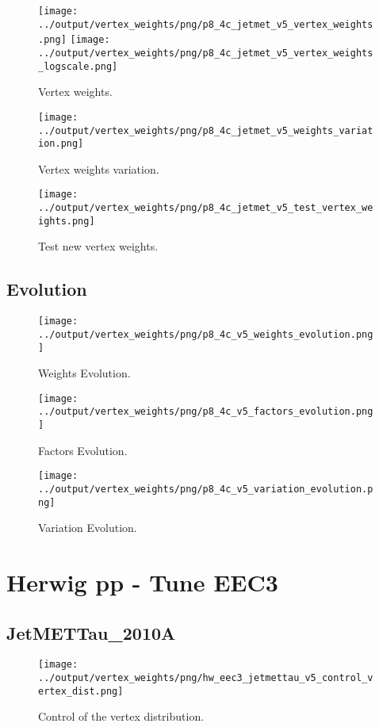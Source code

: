\documentclass[11pt]{book}
\begin{document}
\begin{figure}[ht]
\centering
\texttt{[image: ../output/vertex\_weights/png/p8\_4c\_jetmet\_v5\_vertex\_weights.png]}
\texttt{[image: ../output/vertex\_weights/png/p8\_4c\_jetmet\_v5\_vertex\_weights\_logscale.png]}
\caption{Vertex weights.}
\end{figure}

\begin{figure}[ht]
\centering
\texttt{[image: ../output/vertex\_weights/png/p8\_4c\_jetmet\_v5\_weights\_variation.png]}
\caption{Vertex weights variation.}
\end{figure}

\begin{figure}[ht]
\centering
\texttt{[image: ../output/vertex\_weights/png/p8\_4c\_jetmet\_v5\_test\_vertex\_weights.png]}
\caption{Test new vertex weights.}
\end{figure}
\clearpage

\subsection{Evolution}
\begin{figure}[ht]
\centering
\texttt{[image: ../output/vertex\_weights/png/p8\_4c\_v5\_weights\_evolution.png]}
\caption{Weights Evolution.}
\end{figure}


\begin{figure}[ht]
\centering
\texttt{[image: ../output/vertex\_weights/png/p8\_4c\_v5\_factors\_evolution.png]}
\caption{Factors Evolution.}
\end{figure}

\begin{figure}[ht]
\centering
\texttt{[image: ../output/vertex\_weights/png/p8\_4c\_v5\_variation\_evolution.png]}
\caption{Variation Evolution.}
\end{figure}
\clearpage


\section{Herwig pp - Tune EEC3}
\subsection{JetMETTau\_2010A}
\begin{figure}[ht]
\centering
\texttt{[image: ../output/vertex\_weights/png/hw\_eec3\_jetmettau\_v5\_control\_vertex\_dist.png]}
\caption{Control of the vertex distribution.}
\end{figure}
\end{document}
